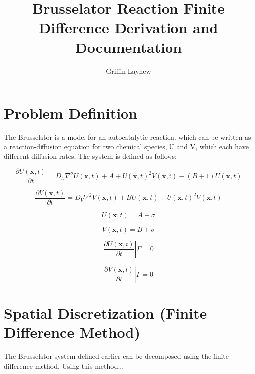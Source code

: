 \documentclass[]{article}
\title{Brusselator Reaction Finite Difference Derivation and Documentation}
\author{Griffin Layhew}
\begin{document}
\maketitle

\begin{abstract}

\end{abstract}

\section{Problem Definition}
The Brusselator is a model for an autocatalytic reaction, which can be written as a reaction-diffusion equation for two chemical species, U and V, which each have different diffusion rates. The system is defined as follows:

\begin{equation}
	\frac{\partial U(\mathbf{x}, t)}{\partial t} = D_U \nabla^2 U(\mathbf{x}, t) + A + U(\mathbf{x}, t)^2 V(\mathbf{x}, t) - (B+1) U(\mathbf{x}, t)
\end{equation}

\begin{equation}
	\frac{\partial V(\mathbf{x}, t)}{\partial t} = D_V \nabla^2 V(\mathbf{x}, t) + BU(\mathbf{x}, t) - U(\mathbf{x}, t)^2 V(\mathbf{x}, t)
\end{equation}

\begin{equation}
	U(\mathbf{x}, t) = A + \sigma
\end{equation}

\begin{equation}
	V(\mathbf{x}, t) = B + \sigma
\end{equation}

\begin{equation}
	\left. \frac{\partial U(\mathbf{x}, t)}{\partial t} \right|\Gamma = 0 
\end{equation}

\begin{equation}
	\left. \frac{\partial V(\mathbf{x}, t)}{\partial t} \right|\Gamma = 0 
\end{equation}



\section{Spatial Discretization (Finite Difference Method)}
The Brusselator system defined earlier can be decomposed using the finite difference method. Using this method...
\end{document}
